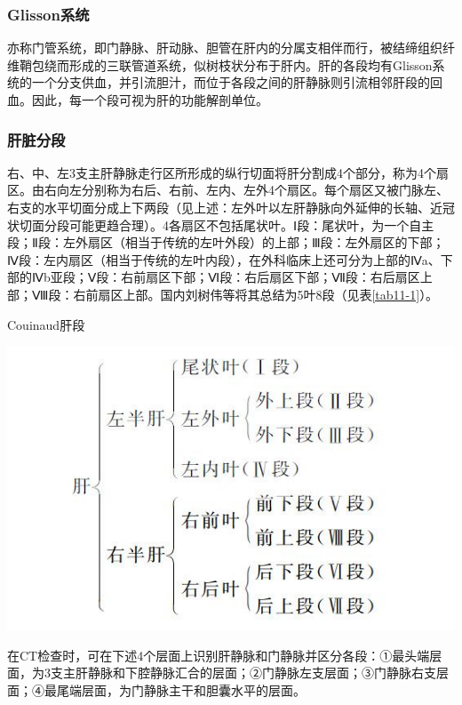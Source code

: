 \subsubsection{Glisson系统}

亦称门管系统，即门静脉、肝动脉、胆管在肝内的分属支相伴而行，被结缔组织纤维鞘包绕而形成的三联管道系统，似树枝状分布于肝内。肝的各段均有Glisson系统的一个分支供血，并引流胆汁，而位于各段之间的肝静脉则引流相邻肝段的回血。因此，每一个段可视为肝的功能解剖单位。

\subsubsection{肝脏分段}

右、中、左3支主肝静脉走行区所形成的纵行切面将肝分割成4个部分，称为4个扇区。由右向左分别称为右后、右前、左内、左外4个扇区。每个扇区又被门脉左、右支的水平切面分成上下两段（见上述：左外叶以左肝静脉向外延伸的长轴、近冠状切面分段可能更趋合理）。4各扇区不包括尾状叶。Ⅰ段：尾状叶，为一个自主段；Ⅱ段：左外扇区（相当于传统的左叶外段）的上部；Ⅲ段：左外扇区的下部；Ⅳ段：左内扇区（相当于传统的左叶内段），在外科临床上还可分为上部的Ⅳa、下部的Ⅳb亚段；Ⅴ段：右前扇区下部；Ⅵ段：右后扇区下部；Ⅶ段：右后扇区上部；Ⅷ段：右前扇区上部。国内刘树伟等将其总结为5叶8段（见表\ref{tab11-1}）。

\begin{table}[htbp]
\centering
\caption{Couinaud肝段}
\label{tab11-1}
\includegraphics[width=\textwidth,height=\textheight,keepaspectratio]{./images/Image00270.jpg}
\end{table}

在CT检查时，可在下述4个层面上识别肝静脉和门静脉并区分各段：①最头端层面，为3支主肝静脉和下腔静脉汇合的层面；②门静脉左支层面；③门静脉右支层面；④最尾端层面，为门静脉主干和胆囊水平的层面。

